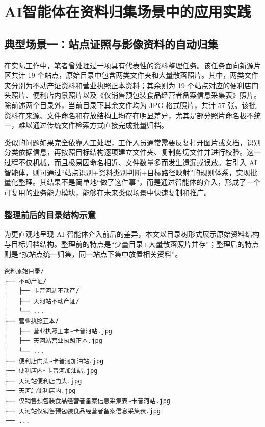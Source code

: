 \section{AI智能体在资料归集场景中的应用实践}

\subsection{典型场景一：站点证照与影像资料的自动归集}

在实际工作中，笔者曾处理过一项具有代表性的资料整理任务。该任务面向新源片区共计 19 个站点，原始目录中包含两类文件夹和大量散落照片。其中，两类文件夹分别为不动产证资料和营业执照正本资料；其余则为 19 个站点对应的便利店门头照片、便利店内景照片以及《仅销售预包装食品经营者备案信息采集表》照片。除前述两个目录外，当前目录下其余文件均为 JPG 格式照片，共计 57 张。该批资料在来源、文件命名和存放结构上均存在明显差异，尤其是部分照片命名极不统一，难以通过传统文件检索方式直接完成批量归档。

类似的问题如果完全依靠人工处理，工作人员通常需要反复打开图片或文档，识别分类依据信息，再按照目标结构逐项建立文件夹、复制剪切文件并进行校验。这一过程不仅机械，而且极易因命名相近、文件数量多而发生遗漏或误放。若引入 AI 智能体，则可通过“站点识别+资料类别判断+目标路径映射”的规则体系，实现批量化整理。其结果不是简单地“做了这件事”，而是通过智能体的介入，形成了一个可复用的业务能力模块，能够在未来类似场景中快速复制和推广。

\subsubsection{整理前后的目录结构示意}

为更直观地呈现 AI 智能体介入前后的差异，本文以目录树形式展示原始资料结构与目标归档结构。整理前的特点是“少量目录+大量散落照片并存”；整理后的特点则是“按站点统一归集，同一站点下集中放置相关资料”。

\newpage

\begin{lstlisting}[style=treeview,caption={整理前的示意性目录结构}]
资料原始目录/
├── 不动产证/
│   ├── 卡普河站不动产/
│   ├── 天河站不动产证/
│   └── ...
├── 营业执照正本/
│   ├── 营业执照正本~卡普河站.jpg
│   ├── 天河站营业执照正本.jpg
│   └── ...
├── 便利店门头~卡普河加油站.jpg
├── 便利店内~卡普河加油站.jpg
├── 天河站便利店门头.jpg
├── 天河站便利店内.jpg
├── 仅销售预包装食品经营者备案信息采集表~卡普河站.jpg
├── 天河站仅销售预包装食品经营者备案信息采集表.jpg
└── ...
\end{lstlisting}

